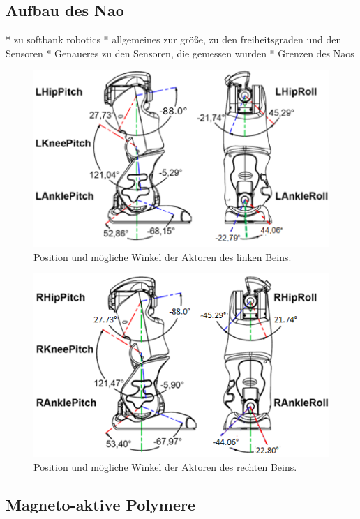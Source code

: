 
\subsection{Aufbau des Nao}
* zu softbank robotics
* allgemeines zur größe, zu den freiheitsgraden und den Sensoren
* Genaueres zu den Sensoren, die gemessen wurden
* Grenzen des Naos
\begin{figure}[htb]
	\centering
	\includegraphics[width=0.7\linewidth]{Bilder/hardware_llegjoint.png}
	\caption{Position und mögliche Winkel der Aktoren des linken Beins. \cite[in /kinematics-data/joints]{nao_docu_dev_guide}}
	\label{hardware_llegjoint}
\end{figure}
\begin{figure}[htb]
	\centering
	\includegraphics[width=0.7\linewidth]{Bilder/hardware_rlegjoint.png}
	\caption{Position und mögliche Winkel der Aktoren des rechten Beins. \cite[in /kinematics-data/joints]{nao_docu_dev_guide}}
	\label{hardware_rlegjoint}
\end{figure}

\subsection{Magneto-aktive Polymere}

